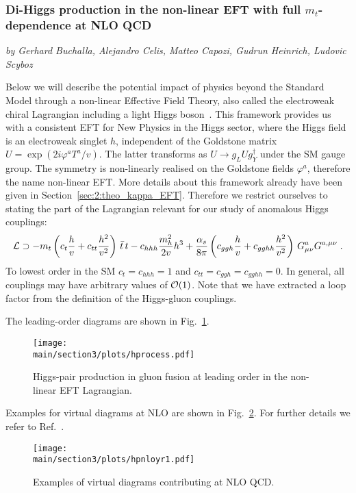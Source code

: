\subsubsection{Di-Higgs production in the non-linear EFT with full $m_t$-dependence at NLO QCD}

\begin{center}
\textit{by Gerhard Buchalla, Alejandro Celis, Matteo Capozi, Gudrun Heinrich, Ludovic Scyboz}
\end{center}


\label{sec:EWChL.double.h}

Below we will describe  the potential impact of physics
beyond the Standard Model through a non-linear Effective Field Theory,
also called the electroweak chiral Lagrangian
including a light Higgs 
boson~\cite{Buchalla:2013rka,Buchalla:2013eza,Buchalla:2017jlu}.
This framework provides us with a consistent EFT
for New Physics in the Higgs sector, where the Higgs field is an electroweak singlet $h$,
independent of the Goldstone matrix $U = \exp(2i\varphi^a T^a/v)$.
The latter transforms as $U\to g_L U g^\dagger_Y$ under the SM gauge group.
The symmetry is non-linearly realised on the Goldstone fields
$\varphi^a$, therefore the name non-linear EFT.
More details about this framework already have been given in
Section~\ref{sec:2:theo_kappa_EFT}.
Therefore we restrict ourselves to stating the part of the Lagrangian
relevant for our study of anomalous Higgs couplings:
\begin{align}
{\cal L}\supset 
-m_t\left(c_t\frac{h}{v}+c_{tt}\frac{h^2}{v^2}\right)\,\bar{t}\,t -
c_{hhh} \frac{m_h^2}{2v} h^3+\frac{\alpha_s}{8\pi} \left( c_{ggh} \frac{h}{v}+
c_{gghh}\frac{h^2}{v^2}  \right)\, G^a_{\mu \nu} G^{a,\mu \nu}\;.
\label{eq:ewchl}
\end{align}
To lowest order in the SM $c_t=c_{hhh}=1$ and $c_{tt}=c_{ggh}=c_{gghh}=0$.
In general, all couplings may have arbitrary values of ${\cal O}(1)$.
Note that we have extracted a loop factor from the definition of the
Higgs-gluon couplings.  


The leading-order diagrams are shown in Fig.~\ref{fig:hprocess}.
\begin{figure}[htb]
\begin{center}
\texttt{[image: \\main/section3/plots/hprocess.pdf]}
\end{center}
\caption{Higgs-pair production in gluon fusion at leading order
in the non-linear EFT Lagrangian.}
\label{fig:hprocess}
\end{figure}
Examples for virtual diagrams at NLO are shown in
Fig.~\ref{fig:virt_examples}.
For further details we refer to Ref.~\cite{Buchalla:2018yce}.
\begin{figure}[htb]
\begin{center}
\texttt{[image: \\main/section3/plots/hpnloyr1.pdf]}
\end{center}
\caption{Examples of virtual diagrams contributing at NLO QCD.}
\label{fig:virt_examples}
\end{figure}


